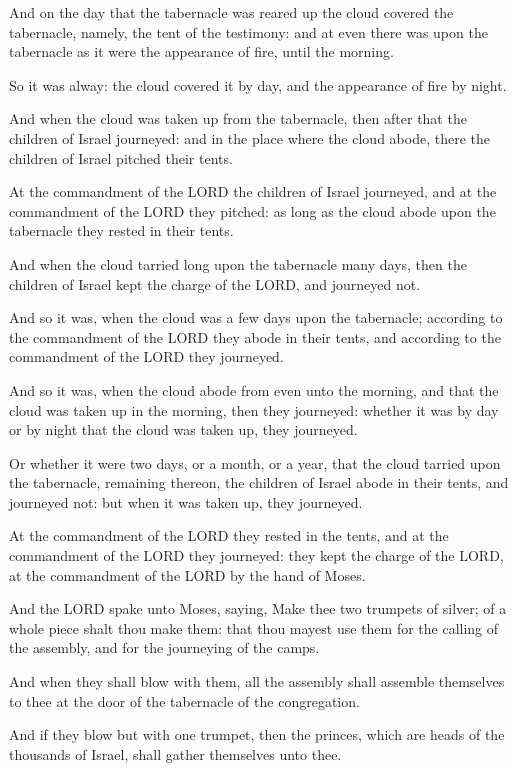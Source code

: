 \Verse And on the day that the tabernacle was reared up the cloud
covered the tabernacle, namely, the tent of the testimony: and at even
there was upon the tabernacle as it were the appearance of fire, until
the morning.

\Verse So it was alway: the cloud covered it by day, and the appearance
of fire by night.

\Verse And when the cloud was taken up from the tabernacle, then after
that the children of Israel journeyed: and in the place where the
cloud abode, there the children of Israel pitched their tents.

\Verse At the commandment of the LORD the children of Israel journeyed,
and at the commandment of the LORD they pitched: as long as the cloud
abode upon the tabernacle they rested in their tents.

\Verse And when the cloud tarried long upon the tabernacle many days,
then the children of Israel kept the charge of the LORD, and journeyed
not.

\Verse And so it was, when the cloud was a few days upon the tabernacle;
according to the commandment of the LORD they abode in their tents,
and according to the commandment of the LORD they journeyed.

\Verse And so it was, when the cloud abode from even unto the morning,
and that the cloud was taken up in the morning, then they journeyed:
whether it was by day or by night that the cloud was taken up, they
journeyed.

\Verse Or whether it were two days, or a month, or a year, that the
cloud tarried upon the tabernacle, remaining thereon, the children of
Israel abode in their tents, and journeyed not: but when it was taken
up, they journeyed.

\Verse At the commandment of the LORD they rested in the tents, and at
the commandment of the LORD they journeyed: they kept the charge of
the LORD, at the commandment of the LORD by the hand of Moses.


\Chapter
\Verse And the LORD spake unto Moses, saying, \Verse Make thee two
trumpets of silver; of a whole piece shalt thou make them: that thou
mayest use them for the calling of the assembly, and for the
journeying of the camps.

\Verse And when they shall blow with them, all the assembly shall
assemble themselves to thee at the door of the tabernacle of the
congregation.

\Verse And if they blow but with one trumpet, then the princes, which
are heads of the thousands of Israel, shall gather themselves unto
thee.

